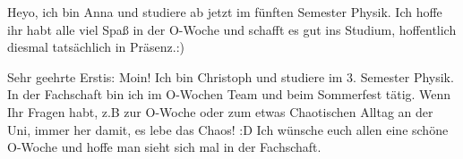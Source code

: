 \begin{multicols}{2}
{
Heyo, ich bin Anna und studiere ab jetzt im fünften Semester Physik. 
Ich hoffe ihr habt alle viel Spaß in der O-Woche und schafft es gut ins Studium, hoffentlich diesmal tatsächlich in Präsenz.:)
}

\vspace{-0.2cm}

{
Sehr geehrte Erstis: Moin!
Ich bin Christoph und studiere im 3. Semester Physik. In der Fachschaft bin ich im O-Wochen Team und beim Sommerfest tätig. Wenn Ihr Fragen habt, z.B zur O-Woche oder zum etwas Chaotischen Alltag an der Uni, immer her damit, es lebe das Chaos! :D 
Ich wünsche euch allen eine schöne O-Woche und hoffe man sieht sich mal in der Fachschaft.
}


\end{multicols}
